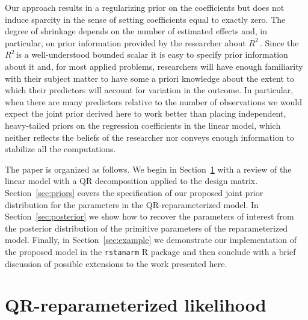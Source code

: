 \documentclass[11pt]{article}
\newcommand{\Rsq}{$R^2\,$}
\begin{document}
Our approach results in a regularizing prior on the coefficients but does not
induce sparcity in the sense of setting coefficients equal to exactly zero. The
degree of shrinkage depends on the number of estimated effects and, in
particular, on prior information provided by the researcher about \Rsq. Since
the \Rsq is a well-understood bounded scalar it is easy to specify prior
information about it and, for most applied problems, researchers will have
enough familiarity with their subject matter to have some a priori knowledge
about the extent to which their predictors will account for variation in the
outcome. In particular, when there are many predictors relative to the number of
observations we would expect the joint prior derived here to work better than
placing independent, heavy-tailed priors on the regression coefficients in the
linear model, which neither reflects the beliefs of the researcher nor conveys
enough information to stabilize all the computations.

The paper is organized as follows. We begin in Section~\ref{sec:likelihood} with
a review of the linear model with a QR decomposition applied to the design
matrix. Section~\ref{sec:priors} covers the specification of our proposed joint
prior distribution for the parameters in the QR-reparameterized model. In
Section~\ref{sec:posterior} we show how to recover the parameters of interest
from the posterior distribution of the primitive parameters of the
reparameterized model. Finally, in Section~\ref{sec:example} we demonstrate our
implementation of the proposed model in the {\tt rstanarm} R package and then
conclude with a brief discussion of possible extensions to the work presented
here.


\section{QR-reparameterized likelihood}
\label{sec:likelihood}
\end{document}
